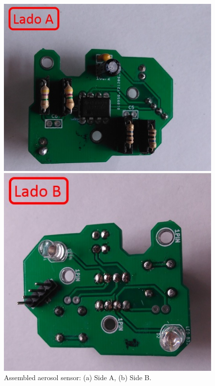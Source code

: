 \documentclass[12pt,letterpaper]{article}
\numberwithin{figure}{section}
\numberwithin{equation}{section}
\numberwithin{table}{section}
\begin{document}
\begin{figure}[H]
   \centering
    \begin{minipage}{.5\textwidth}
    \centering
    \includegraphics[width=\linewidth]{Figuras/figure_6_a.jpg}
    \end{minipage}%
    \begin{minipage}{0.5\textwidth}
    \centering
    \includegraphics[width=\linewidth]{Figuras/figure_6_b.jpg}   
    \end{minipage}
    \caption{Assembled aerosol sensor: (a) Side A, (b) Side B.}
    \label{fig:6}
\end{figure}
\end{document}
